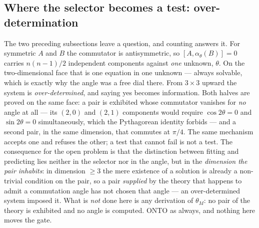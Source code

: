 \documentclass[11pt]{article}
\theoremstyle{definition}\newtheorem{deriv}{Derivation}
\begin{document}
\subsection*{Where the selector becomes a test: over-determination}The two preceding subsections leave a question, and counting answers it. For symmetric $A$ and $B$ the commutator is antisymmetric, so $[A,\alpha_\theta(B)]=0$ carries $n(n-1)/2$ independent components against \emph{one} unknown, $\theta$. On the two-dimensional face that is one equation in one unknown --- always solvable, which is exactly why the angle was a free dial there. From $3\times 3$ upward the system is \emph{over-determined}, and saying yes becomes information. Both halves are proved on the same face: a pair is exhibited whose commutator vanishes for \emph{no} angle at all --- its $(2,0)$ and $(2,1)$ components would require $\cos 2\theta = 0$ and $\sin 2\theta = 0$ simultaneously, which the Pythagorean identity forbids --- and a second pair, in the same dimension, that commutes at $\pi/4$. The same mechanism accepts one and refuses the other; a test that cannot fail is not a test. The consequence for the open problem is that the distinction between fitting and predicting lies neither in the selector nor in the angle, but in the \emph{dimension the pair inhabits}: in dimension $\geq 3$ the mere existence of a solution is already a non-trivial condition on the pair, so a pair \emph{supplied} by the theory that happens to admit a commutation angle has not chosen that angle --- an over-determined system imposed it. What is \emph{not} done here is any derivation of $\theta_M$: no pair of the theory is exhibited and no angle is computed. \textsf{ONTO} as always, and nothing here moves the gate.
\end{document}
